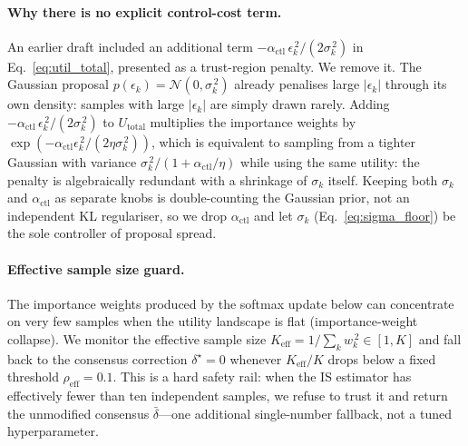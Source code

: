 \documentclass{article}
\begin{document}
\paragraph{Why there is no explicit control-cost term.}
An earlier draft included an additional term
$-\alpha_{\text{ctl}}\,\epsilon_k^{\,2}/(2\sigma_k^{\,2})$ in
Eq.~\ref{eq:util_total}, presented as a trust-region penalty. We remove it.
The Gaussian proposal $p(\epsilon_k)=\mathcal{N}(0,\sigma_k^{\,2})$ already
penalises large $|\epsilon_k|$ through its own density: samples with large
$|\epsilon_k|$ are simply drawn rarely. Adding $-\alpha_{\text{ctl}}\,\epsilon_k^{\,2}/(2\sigma_k^{\,2})$
to $U_{\text{total}}$ multiplies the importance weights by
$\exp(-\alpha_{\text{ctl}}\epsilon_k^{\,2}/(2\eta\sigma_k^{\,2}))$, which is
equivalent to sampling from a tighter Gaussian with variance
$\sigma_k^{\,2}/(1+\alpha_{\text{ctl}}/\eta)$ while using the same utility:
the penalty is algebraically redundant with a shrinkage of $\sigma_k$ itself.
Keeping both $\sigma_k$ and $\alpha_{\text{ctl}}$ as separate knobs is
double-counting the Gaussian prior, not an independent KL regulariser, so we
drop $\alpha_{\text{ctl}}$ and let $\sigma_k$ (Eq.~\ref{eq:sigma_floor}) be the
sole controller of proposal spread.

\paragraph{Effective sample size guard.}
The importance weights produced by the softmax update below can concentrate
on very few samples when the utility landscape is flat
(importance-weight collapse). We monitor the effective sample size
$K_{\text{eff}} = 1\big/\sum_{k}w_k^{\,2}\in[1,K]$ and fall back to the
consensus correction $\delta^{\star}=0$ whenever $K_{\text{eff}}/K$ drops
below a fixed threshold $\rho_{\text{eff}}=0.1$. This is a hard safety rail:
when the IS estimator has effectively fewer than ten independent samples, we
refuse to trust it and return the unmodified consensus
$\bar{\delta}$---one additional single-number fallback, not a tuned
hyperparameter.
\end{document}
